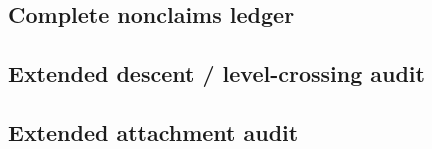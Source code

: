 \subsection{Complete nonclaims ledger}\label{subsec:nonclaims-ledger}


\begin{description}
\end{description}

\subsection{Extended descent / level-crossing audit}\label{subsec:extended-descent-audit}


\subsection{Extended attachment audit}\label{subsec:extended-attachment-audit}

